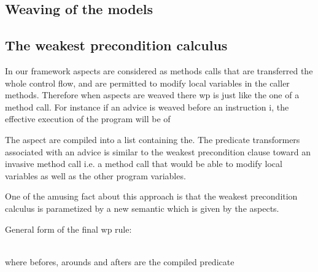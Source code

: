 \subsection{Weaving of the models}


\subsection{The weakest precondition calculus}

In our framework aspects are considered as methods calls that are
transferred the whole control flow, and are permitted to modify local
variables in the caller methods. Therefore when aspects are weaved
there wp is just like the one of a method call.  For instance if an
advice is weaved before an instruction i, the effective execution of
the program will be of

The aspect are compiled into a list containing the.  The predicate
transformers associated with an advice is similar to the weakest
precondition clause toward an invasive method call i.e. a method call
that would be able to modify local variables as well as the other
program variables.

One of the amusing fact about this approach is that the weakest
precondition calculus is parametized by a new semantic which is given
by the aspects.

General form of the final wp rule: 
\bcode

\\
\ecode
where befores, arounds and afters are the compiled predicate
